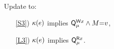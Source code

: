 \begin{definition}[$\xCO$/$\xRASC$]
  \label{def:QS}
  \label{def:pomsets-ra}
  Update  to:
  \begin{enumerate}
  \item[\ref{S3})]
    $\kappa(e)$ implies $\mathsf{Q}_{\mu}^{\mathsf{W}x}\land M{=}v$,
  \item[\ref{L3})]
    $\kappa(e)$ implies $\mathsf{Q}_{\mu}^{\mathsf{R}x}$.
  \end{enumerate}
\end{definition}








